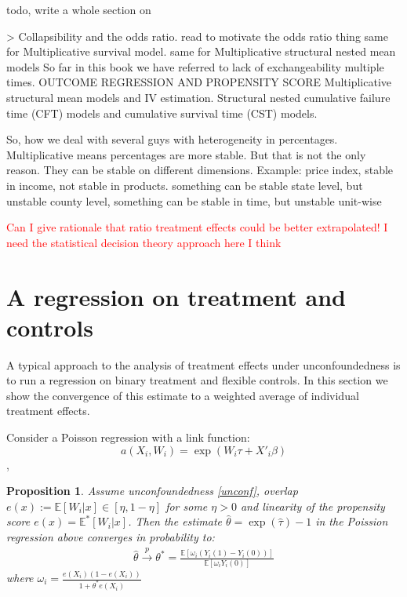 \documentclass[a4paper,12pt]{article}
\theoremstyle{plain}
\newtheorem{prop}{Proposition}
\begin{document}
todo, write a whole section on 

> Collapsibility and the odds ratio.  read to motivate the odds ratio thing
same for Multiplicative survival model.
same for Multiplicative structural nested mean models
So far in this book we have referred to lack of exchangeability multiple times.
OUTCOME REGRESSION AND PROPENSITY SCORE
Multiplicative structural mean models and IV estimation.
Structural nested cumulative failure time (CFT) models and cumulative survival time (CST) models.

So, how we deal with several guys with heterogeneity in percentages. Multiplicative means percentages are more stable. But that is not the only reason. They can be stable on different dimensions. Example: price index, stable in income, not stable in products. something can be stable state level, but unstable county level, something can be stable in time, but unstable unit-wise

\textcolor{red}{Can I give rationale that ratio treatment effects could be better extrapolated!}
\textcolor{red}{I need the statistical decision theory approach here I think}

\section{A regression on treatment and controls}

A typical approach to the analysis of treatment effects under unconfoundedness is to run a regression on binary treatment and flexible controls. In this section we show the convergence of this estimate to a weighted average of individual treatment effects. 

Consider a Poisson regression with a link function:
$$a(X_i, W_i) = \exp(W_i\tau + X'_i\beta)$$,

\begin{prop}
\label{prop:insample} Assume unconfoundedness \eqref{unconf}, overlap $e(x) := \mathbb{E}[W_i | x] \in [\eta, 1 - \eta]$ for some $\eta > 0$ and linearity of the propensity score $e(x) = \mathbb{E}^\ast[W_i | x]$. Then the estimate $\hat \theta = \exp(\hat \tau) - 1$ in the Poission regression above converges in probability to:
\begin{gather}
      \hat \theta \overset{p}{\to} \theta^\ast = \frac{\mathbb{E}[\omega_i(Y_i(1) - Y_i(0))]}{\mathbb{E}[\omega_i Y_i(0)]} \label{formula:convex_ratio}
\end{gather}
where $\omega_i = \frac{e(X_i)(1 - e(X_i))}{1 + \theta^\ast e(X_i)}$
\end{prop}
\end{document}

